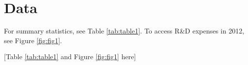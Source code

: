 \section{Data}

For summary statistics, see Table \ref{tab:table1}. To access R\&D expenses in 2012, see Figure \ref{fig:fig1}.

\begin{center}
    [Table \ref{tab:table1} and Figure \ref{fig:fig1} here]
\end{center}









